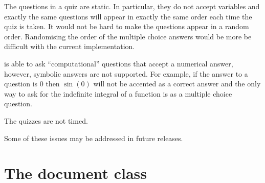 \documentclass[svgnames]{article}
\begin{document}
    The questions in a \MathQuiz quiz are static. In particular, they do
    not accept variables and exactly the same questions will appear in
    exactly the same order each time the quiz is taken. It would not be
    hard to make the questions appear in a random order. Randomising the
    order of the multiple choice answers would be more be difficult with
    the current implementation.

    \MathQuiz is able to ask ``computational'' questions that accept a
    numerical answer, however, symbolic answers are not supported.
    For example, if the answer to a question is $0$ then $\sin(0)$ will
    not be accented as a correct answer and the only way to ask for the
    indefinite integral of a function is as a multiple choice question.

    The quizzes are not timed.

    Some of these issues may be addressed in future releases.

\section{The \MathQuiz document class}\label{S:documentclass}
\end{document}
